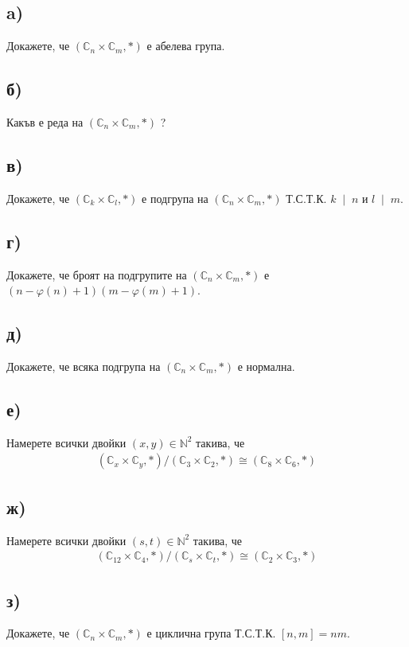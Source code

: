 \documentclass[a4paper, 12pt, oneside]{article}
\begin{document}
\subsection*{a)}
Докажете, че \((\mathbb{C}_n \times \mathbb{C}_m, *)\) е абелева група.
\subsection*{б)}
Какъв е реда на \((\mathbb{C}_n \times \mathbb{C}_m, *)\) ?
\subsection*{в)}
Докажете, че \((\mathbb{C}_k \times \mathbb{C}_l, *)\) е подгрупа на \((\mathbb{C}_n \times \mathbb{C}_m, *)\) Т.С.Т.К. \(k \; \mid \; n\) и \(l \; \mid \; m\).
\subsection*{г)}
Докажете, че броят на подгрупите на \((\mathbb{C}_n \times \mathbb{C}_m, *)\) е \((n - \varphi(n) + 1)(m - \varphi(m) + 1)\).
\subsection*{д)}
Докажете, че всяка подгрупа на \((\mathbb{C}_n \times \mathbb{C}_m, *)\) е нормална.
\subsection*{е)}
Намерете всички двойки \((x, y) \in \mathbb{N}^2\) такива, че
\begin{align*}
    (\mathbb{C}_x \times \mathbb{C}_y, *) / (\mathbb{C}_3 \times \mathbb{C}_2, *) \cong (\mathbb{C}_8 \times \mathbb{C}_6, *)
\end{align*}
\subsection*{ж)}
Намерете всички двойки \((s, t) \in \mathbb{N}^2\) такива, че
\begin{align*}
    (\mathbb{C}_{12} \times \mathbb{C}_4, *) / (\mathbb{C}_s \times \mathbb{C}_t, *) \cong (\mathbb{C}_2 \times \mathbb{C}_3, *)
\end{align*}
\subsection*{з)}
Докажете, че \((\mathbb{C}_n \times \mathbb{C}_m, *)\) е циклична група Т.С.Т.К. \([n, m] = nm\).
\end{document}
